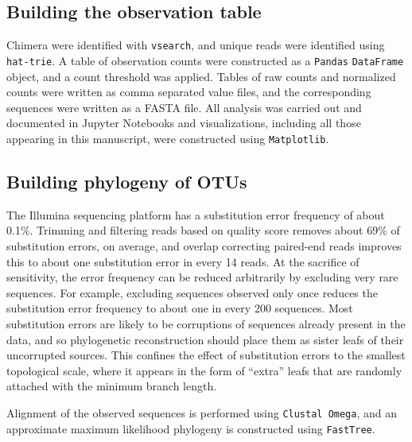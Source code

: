 \subsection{Building the observation table}

Chimera were identified with {\tt vsearch}, \cite{rognes2016vsearch} and unique reads were identified using {\tt hat-trie}. \cite{askitis2005cache, askitis2007hat} A table of observation counts were constructed as a {\tt Pandas} {\tt DataFrame} object, \cite{mckinney2010data} and a count threshold was applied. Tables of raw counts and normalized counts were written as comma separated value files, and the corresponding sequences were written as a FASTA file. All analysis was carried out and documented in Jupyter Notebooks \cite{perez2007ipython} and visualizations, including all those appearing in this manuscript, were constructed using {\tt Matplotlib}. \cite{hunter2007matplotlib}

\subsection{Building phylogeny of OTUs}

The Illumina sequencing platform has a substitution error frequency of about 0.1\%. \cite{ross2013characterizing} Trimming and filtering reads based on quality score removes about 69\% of substitution errors, on average, \cite{schirmer2016illumina} and overlap correcting paired-end reads improves this to about one substitution error in every 14 reads. \cite{bolger2014trimmomatic} At the sacrifice of sensitivity, the error frequency can be reduced arbitrarily by excluding very rare sequences. For example, excluding sequences observed only once reduces the substitution error frequency to about one in every 200 sequences. Most substitution errors are likely to be corruptions of sequences already present in the data, and so phylogenetic reconstruction should place them as sister leafs of their uncorrupted sources. This confines the effect of substitution errors to the smallest topological scale, where it appears in the form of ``extra'' leafs that are randomly attached with the minimum branch length.

Alignment of the observed sequences is performed using {\tt Clustal Omega}, \cite{goujon2010new, sievers2011fast} and an approximate maximum likelihood phylogeny is constructed using {\tt FastTree}. \cite{price2009fasttree, price2010fasttree}


